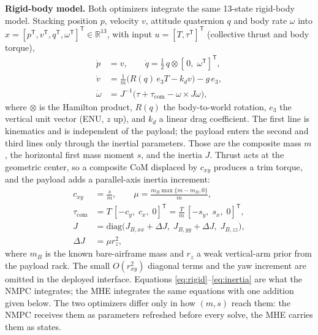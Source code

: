 \documentclass[conference]{IEEEtran}
\begin{document}
\textbf{Rigid-body model.} Both optimizers integrate the same 13-state rigid-body model.
Stacking position $p$, velocity $v$, attitude quaternion $q$ and body rate $\omega$ into
$x=[p^{\mathsf T},v^{\mathsf T},q^{\mathsf T},\omega^{\mathsf T}]^{\mathsf T}\in\mathbb R^{13}$,
with input $u=[T,\tau^{\mathsf T}]^{\mathsf T}$ (collective thrust and body torque),
\begin{equation}
\begin{aligned}
\dot p &= v, \qquad \dot q = \tfrac12\,q\otimes[\,0,\;\omega^{\mathsf T}]^{\mathsf T},\\
\dot v &= \tfrac{1}{m}\bigl(R(q)\,e_3T-k_d v\bigr)-g\,e_3,\\
\dot \omega &= J^{-1}\bigl(\tau+\tau_{\mathrm{com}}-\omega\times J\omega\bigr),
\end{aligned}
\label{eq:rigid}
\end{equation}
where $\otimes$ is the Hamilton product, $R(q)$ the body-to-world rotation, $e_3$ the vertical
unit vector (ENU, $z$ up), and $k_d$ a linear drag coefficient. The first line is kinematics and
is independent of the payload; the payload enters the second and third lines only through the
inertial parameters. Those are the composite mass $m$, the horizontal first mass moment $s$, and
the inertia $J$. Thrust acts at the geometric center, so a composite CoM displaced by $c_{xy}$
produces a trim torque, and the payload adds a parallel-axis inertia increment:
\begin{equation}
\begin{aligned}
c_{xy} &= \frac{s}{m},\qquad
\mu = \frac{m_B\max\{m-m_B,0\}}{m},\\
\tau_{\mathrm{com}} &= T\,[-c_y,\;c_x,\;0]^{\mathsf T}
                     = \frac{T}{m}\,[-s_y,\;s_x,\;0]^{\mathsf T},\\
J &= \mathrm{diag}\bigl(J_{B,xx}+\Delta J,\;J_{B,yy}+\Delta J,\;J_{B,zz}\bigr),\\
\Delta J &= \mu r_z^2,
\end{aligned}
\label{eq:inertia}
\end{equation}
where $m_B$ is the known bare-airframe mass and $r_z$ a weak vertical-arm prior from the payload
rack. The small $O(r_{xy}^2)$ diagonal terms and the yaw increment are omitted in the deployed
interface. Equations \eqref{eq:rigid}--\eqref{eq:inertia} are what the NMPC integrates; the MHE
integrates the same equations with one addition given below. The two optimizers differ only in
how $(m,s)$ reach them: the NMPC receives them as parameters refreshed before every solve, the
MHE carries them as states.
\end{document}
